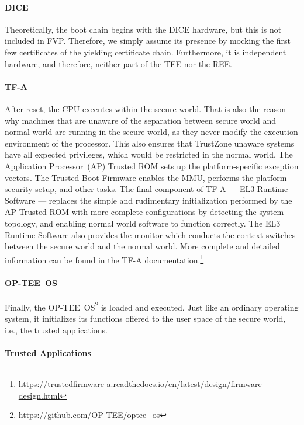\paragraph{DICE}
Theoretically, the boot chain begins with the DICE hardware, but this is not included in FVP\@.
Therefore, we simply assume its presence by mocking the first few certificates of the yielding certificate chain.
Furthermore, it is independent hardware, and therefore, neither part of the TEE nor the REE\@.

\paragraph{TF-A}
After reset, the CPU executes within the secure world.
That is also the reason why machines that are unaware of the separation between secure world and normal world are running in the secure world, as they never modify the execution environment of the processor.
This also ensures that TrustZone unaware systems have all expected privileges, which would be restricted in the normal world.
The Application Processor~(AP) Trusted ROM sets up the platform-specific exception vectors.
The Trusted Boot Firmware enables the MMU, performs the platform security setup, and other tasks.
The final component of TF-A --- EL3 Runtime Software --- replaces the simple and rudimentary initialization performed by the AP Trusted ROM with more complete configurations by detecting the system topology, and enabling normal world software to function correctly.
The EL3 Runtime Software also provides the monitor which conducts the context switches between the secure world and the normal world.
More complete and detailed information can be found in the TF-A documentation.\footnote{\url{https://trustedfirmware-a.readthedocs.io/en/latest/design/firmware-design.html}}

\paragraph{OP-TEE~OS}
Finally, the OP-TEE~OS\footnote{\url{https://github.com/OP-TEE/optee_os}} is loaded and executed.
Just like an ordinary operating system, it initializes its functions offered to the user space of the secure world, i.e., the trusted applications.

\paragraph{Trusted Applications}

